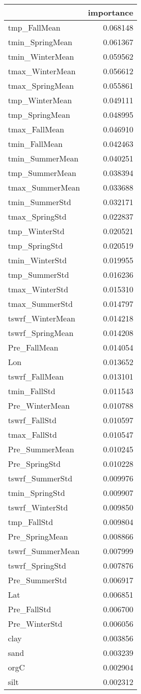 \begin{tabular}{lr}
\toprule
 & importance \\
\midrule
tmp_FallMean & 0.068148 \\
tmin_SpringMean & 0.061367 \\
tmin_WinterMean & 0.059562 \\
tmax_WinterMean & 0.056612 \\
tmax_SpringMean & 0.055861 \\
tmp_WinterMean & 0.049111 \\
tmp_SpringMean & 0.048995 \\
tmax_FallMean & 0.046910 \\
tmin_FallMean & 0.042463 \\
tmin_SummerMean & 0.040251 \\
tmp_SummerMean & 0.038394 \\
tmax_SummerMean & 0.033688 \\
tmin_SummerStd & 0.032171 \\
tmax_SpringStd & 0.022837 \\
tmp_WinterStd & 0.020521 \\
tmp_SpringStd & 0.020519 \\
tmin_WinterStd & 0.019955 \\
tmp_SummerStd & 0.016236 \\
tmax_WinterStd & 0.015310 \\
tmax_SummerStd & 0.014797 \\
tswrf_WinterMean & 0.014218 \\
tswrf_SpringMean & 0.014208 \\
Pre_FallMean & 0.014054 \\
Lon & 0.013652 \\
tswrf_FallMean & 0.013101 \\
tmin_FallStd & 0.011543 \\
Pre_WinterMean & 0.010788 \\
tswrf_FallStd & 0.010597 \\
tmax_FallStd & 0.010547 \\
Pre_SummerMean & 0.010245 \\
Pre_SpringStd & 0.010228 \\
tswrf_SummerStd & 0.009976 \\
tmin_SpringStd & 0.009907 \\
tswrf_WinterStd & 0.009850 \\
tmp_FallStd & 0.009804 \\
Pre_SpringMean & 0.008866 \\
tswrf_SummerMean & 0.007999 \\
tswrf_SpringStd & 0.007876 \\
Pre_SummerStd & 0.006917 \\
Lat & 0.006851 \\
Pre_FallStd & 0.006700 \\
Pre_WinterStd & 0.006056 \\
clay & 0.003856 \\
sand & 0.003239 \\
orgC & 0.002904 \\
silt & 0.002312 \\
\bottomrule
\end{tabular}
